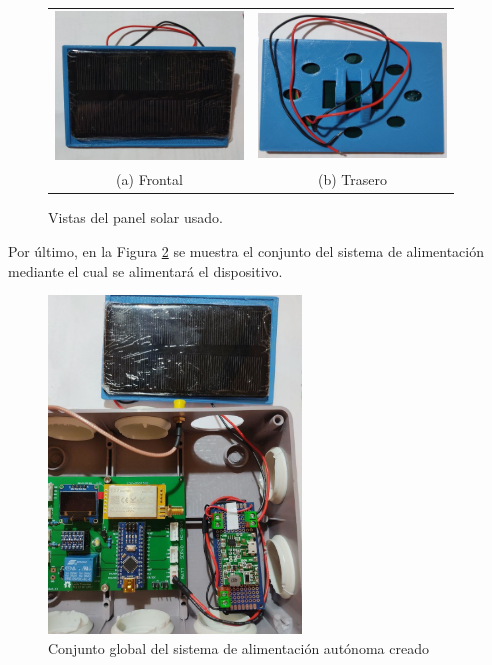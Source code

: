 \documentclass[12pt]{article}
\begin{document}
	\begin{figure}[h!]
		\begin{center}
			\begin{tabular}{cc}
				\includegraphics[width=50mm]{img/panel_solar_frontal.jpg} &   \includegraphics[width=50mm]{img/panel_solar_trasero.jpg} \\
				(a) Frontal & (b) Trasero  \\[6pt]
			\end{tabular}
			\caption{Vistas del panel solar usado.}
			\label{panel solar}
		\end{center}
	\end{figure}
	
	\pagebreak
	
	\noindent Por último, en la Figura \ref{prototipo alimentacion completo} se muestra el conjunto del sistema de alimentación mediante el cual se alimentará el dispositivo. \\
	
	\begin{figure}[h!]
		\begin{center}
			\includegraphics[width=0.6\textwidth]{img/conglomerado_alimentacion_zoom_1.jpg}
			\caption{Conjunto global del sistema de alimentación autónoma creado}
			\label{prototipo alimentacion completo}
		\end{center}
	\end{figure}
\end{document}
